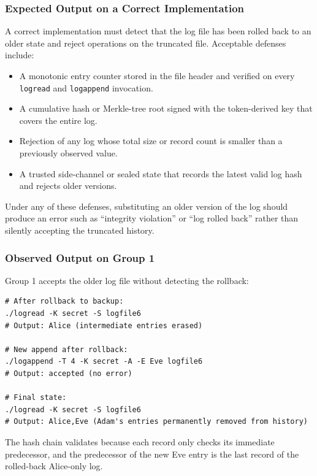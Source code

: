 \documentclass[a4paper, 12pt]{article}
\begin{document}
    \subsubsection{Expected Output on a Correct Implementation}
    A correct implementation must detect that the log file has been rolled back to an older state and reject operations on the truncated file. Acceptable defenses include:
    \begin{itemize}
        \item A monotonic entry counter stored in the file header and verified on every \texttt{logread} and \texttt{logappend} invocation.
        \item A cumulative hash or Merkle-tree root signed with the token-derived key that covers the entire log.
        \item Rejection of any log whose total size or record count is smaller than a previously observed value.
        \item A trusted side-channel or sealed state that records the latest valid log hash and rejects older versions.
    \end{itemize}
    Under any of these defenses, substituting an older version of the log should produce an error such as ``integrity violation'' or ``log rolled back'' rather than silently accepting the truncated history.

    \subsubsection{Observed Output on Group 1}
    Group 1 accepts the older log file without detecting the rollback:
    \begin{lstlisting}
# After rollback to backup:
./logread -K secret -S logfile6
# Output: Alice (intermediate entries erased)

# New append after rollback:
./logappend -T 4 -K secret -A -E Eve logfile6
# Output: accepted (no error)

# Final state:
./logread -K secret -S logfile6
# Output: Alice,Eve (Adam's entries permanently removed from history)
    \end{lstlisting}
    The hash chain validates because each record only checks its immediate predecessor, and the predecessor of the new Eve entry is the last record of the rolled-back Alice-only log.
\end{document}
